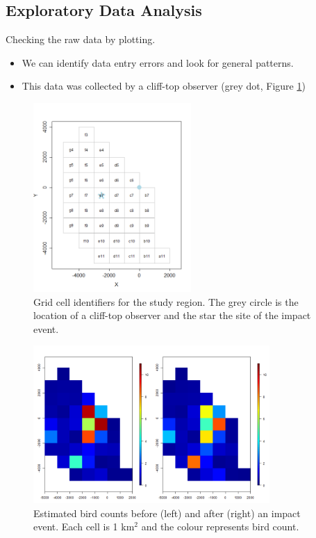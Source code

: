\documentclass[11pt, a4paper]{article}
\begin{document}
\subsection{Exploratory Data Analysis}
\begin{frame}[fragile]
Checking the raw data by plotting.  
\begin{itemize}
\item We can identify data entry errors and look for general patterns.
\item This data was collected by a cliff-top observer (grey dot, Figure \ref{fig:gridcells})
\end{itemize}


\begin{figure}[h]
  \centering
  \includegraphics[width=6cm]{vpgridcells.png}
\caption{Grid cell identifiers for the study region.  The grey circle is the location of a cliff-top observer and the star the site of the impact event.}
\label{fig:gridcells}
\end{figure}
\end{frame}

\begin{frame}
\begin{figure}[h]
\centering
  \includegraphics[width=9cm]{birds.png}
\caption{Estimated bird counts before (left) and after (right) an impact event.  Each cell is 1 km$^2$ and the colour represents bird count.}
\label{fig:rawnhats}
\end{figure}
\end{frame}
\end{document}
